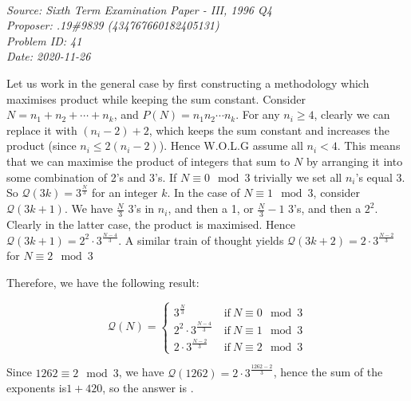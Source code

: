 \SSbreak\\
\emph{Source: Sixth Term Examination Paper - III, 1996 Q4}\\
\emph{Proposer: .19\#9839 (434767660182405131)}\\
\emph{Problem ID: 41}\\
\emph{Date: 2020-11-26}\\
\SSbreak

\bigskip

\begin{solution}\hfil\medskip

    Let us work in the general case by first constructing a methodology which maximises product while keeping the sum constant. Consider \(N=n_1+n_2+\cdots+n_k\), and \(P(N)=n_1n_2\cdots n_k\). For any \(n_i\geq 4\), clearly we can replace it with \((n_i-2)+2\), which keeps the sum constant and increases the product (since \(n_i\leq 2(n_i-2)\)). Hence W.O.L.G assume all \(n_i<4\). This means that we can maximise the product of integers that sum to \(N\) by arranging it into some combination of 2's and 3's. If \(N\equiv0\mod{3}\) trivially we set all \(n_i\)'s equal 3. So \(\mathcal{Q}(3k)=3^{\frac{N}{3}}\) for an integer \(k\). In the case of \(N\equiv 1\mod{3}\), consider\(\mathcal{Q}(3k+1)\). We have \(\frac{N}{3}\) 3's in \(n_i\), and then a 1, or \(\frac{N}{3}-1\) 3's, and then a \(2^2\). Clearly in the latter case, the product is maximised. Hence \(\mathcal{Q}(3k+1)=2^2\cdot3^{\frac{N-4}{3}}\). A similar train of thought yields \(\mathcal{Q}(3k+2)=2\cdot3^{\frac{N-2}{3}}\) for \(N\equiv 2\mod{3}\)\medskip
    
    Therefore, we have the following result:
    
    \begin{equation*}
        \mathcal{Q}(N)=
        \begin{cases}
            3^{\frac{N}{3}}\ &\mathrm{if}\ N \equiv 0 \mod 3\\
            2^2\cdot3^{\frac{N-4}{3}}\ &\mathrm{if}\ N \equiv 1 \mod 3\\
            2\cdot3^{\frac{N-2}{3}}\ &\mathrm{if}\ N \equiv 2 \mod 3
        \end{cases}
    \end{equation*}
    
    Since \(1262\equiv 2\mod 3\), we have \(\mathcal{Q}(1262)=2\cdot3^{\frac{1262-2}{3}}\), hence the sum of the exponents is\(1+420\), so the answer is .
\end{solution}\bigskip